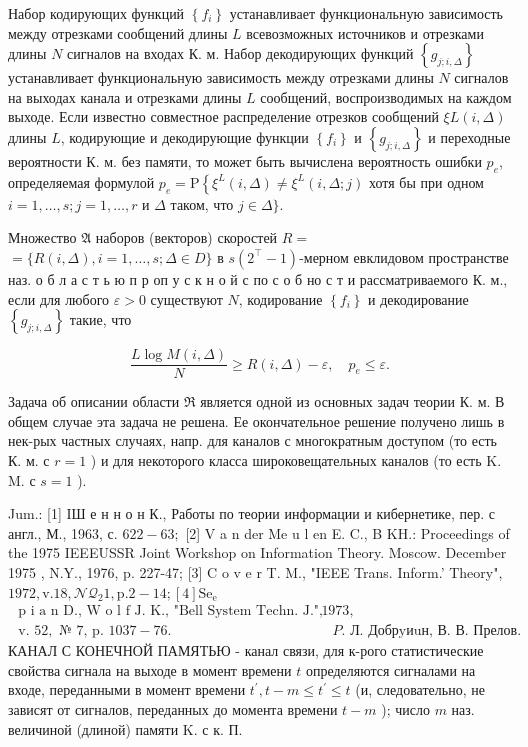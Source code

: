 \documentclass[10pt]{article}
\begin{document}
Набор кодирующих функций $\left\{f_{i}\right\}$ устанавливает функциональную зависимость между отрезками сообщений длины $L$ всевозможных источников и отрезками длины $N$ сигналов на входах К. м. Набор декодирующих функций $\left\{g_{j ; i, \Delta}\right\}$ устанавливает функциональную зависимость между отрезками длины $N$ сигналов на выходах канала и отрезками длины $L$ сообщений, воспроизводимых на каждом выходе. Если известно совместное распределение отрезков сообщений $\xi L(i, \Delta)$ длины $L$, кодирующие и декодирующие функции $\left\{f_{i}\right\}$ и $\left\{g_{j ; i, \Delta}\right\}$ и переходные вероятности К. м. без памяти, то может быть вычислена вероятность ошибки $p_{e}$, определяемая формулой $p_{e}=\mathrm{P}\left\{\xi^{L}(i, \Delta) \neq \xi^{L}(i, \Delta ; j)\right.$ хотя бы при одном $i=1, \ldots, s ; j=1, \ldots, r$ и $\Delta$ таком, что $j \in \Delta\}$.



Множество $\mathfrak{A}$ наборов (векторов) скоростей $R=$ $=\{R(i, \Delta), i=1, \ldots, s ; \Delta \in D\}$ в $s\left(2^{\top}-1\right)$-мерном евклидовом пространстве наз. о б л а с т ь ю п р оп у с к н о й с по с о б но с т и рассматриваемого К. м., если для любого $\varepsilon>0$ существуют $N$, кодирование $\left\{f_{i}\right\}$ и декодирование $\left\{g_{j ; i, \Delta}\right\}$ такие, что



\[

\frac{L \log M(i, \Delta)}{N} \geqslant R(i, \Delta)-\varepsilon, \quad p_{e} \leqslant \varepsilon .

\]



Задача об описании области $\mathfrak{R}$ является одной из основных задач теории К. м. В общем случае эта задача не решена. Ее окончательное решение получено лишь в нек-рых частных случаях, напр. для каналов с многократным доступом (то есть К. м. с $r=1$ ) и для некоторого класса широковещательных каналов (то есть K. M. с $s=1$ ).



Jum.: [1] IШ е н н о н К., Работы по теории информации и кибернетике, пер. с англ., М., 1963, с. $622-63 ;$ [2] V a n der Me u l en E. C., B KH.: Proceedings of the 1975 IEEEUSSR Joint Workshop on Information Theory. Moscow. December 1975 , N.Y., 1976, p. 227-47; [3] C o v e r T. M., "IEEE Trans. Inform.' Theory", $1972, \mathrm{v} .18, \mathcal{N Q}_{2} 1, \mathrm{p} .2-14 ;[4] \mathrm{S} \mathrm{e}_{\mathrm{e}}$ $\begin{array}{ll}\text { p i a n D., W o l f J. K., "Bell System Techn. J.", } 1973, \\ \text { v. } 52, \text { № 7, p. } 1037-76 . & P . \text { Л. Добрyиuн, В. В. Прелов. }\end{array}$ КАНАЛ С КОНЕЧНОЙ ПАМЯТЬЮ - канал связи, для к-рого статистические свойства сигнала на выходе в момент времени $t$ определяются сигналами на входе, переданными в момент времени $t^{\prime}, t-m \leqslant t^{\prime} \leqslant t$ (и, следовательно, не зависят от сигналов, переданных до момента времени $t-m$ ); число $m$ наз. величиной (длиной) памяти K. с к. П.
\end{document}
